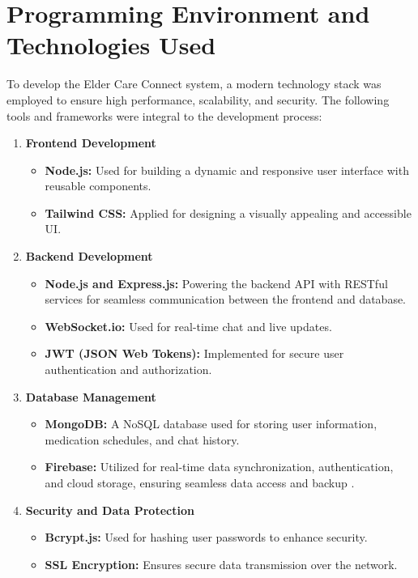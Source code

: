 \section{Programming Environment and Technologies Used}
To develop the Elder Care Connect system, a modern technology stack was employed to ensure high performance, scalability, and security. The following tools and frameworks were integral to the development process:
\begin{enumerate}
    \item \textbf{Frontend Development}
        \begin{itemize}
            \item \textbf{Node.js:} Used for building a dynamic and responsive user interface with reusable components.
            \item \textbf{Tailwind CSS:} Applied for designing a visually appealing and accessible UI.
        \end{itemize}
    \item \textbf{Backend Development}
        \begin{itemize}
            \item \textbf{Node.js and Express.js:} Powering the backend API with RESTful services for seamless communication between the frontend and database.
            \item \textbf{WebSocket.io:} Used for real-time chat and live updates.
            \item \textbf{JWT (JSON Web Tokens):} Implemented for secure user authentication and authorization.
        \end{itemize}
    \item \textbf{Database Management}
    \begin{itemize}
        \item \textbf{MongoDB:} A NoSQL database used for storing user information, medication schedules, and chat history.
        \item \textbf{Firebase:} Utilized for real-time data synchronization, authentication, and cloud storage, ensuring seamless data access and backup \cite{firebase_docs}.
    \end{itemize}
    \item \textbf{Security and Data Protection}
        \begin{itemize}
            \item \textbf{Bcrypt.js:} Used for hashing user passwords to enhance security.
            \item \textbf {SSL Encryption:} Ensures secure data transmission over the network.
        \end{itemize}
\end{enumerate}

